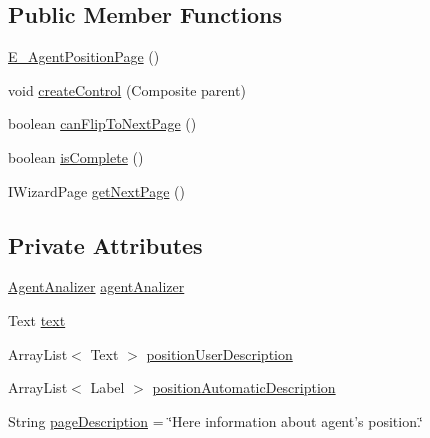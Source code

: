 \subsection*{Public Member Functions}
\begin{DoxyCompactItemize}
\item 
\hyperlink{classit_1_1isislab_1_1masonassisteddocumentation_1_1mason_1_1wizards_1_1_e___agent_position_page_a760dd943747cb5b179c21dee2718b687}{E\-\_\-\-Agent\-Position\-Page} ()
\item 
void \hyperlink{classit_1_1isislab_1_1masonassisteddocumentation_1_1mason_1_1wizards_1_1_e___agent_position_page_aa023f9adb3e974627277e49dfeb19a59}{create\-Control} (Composite parent)
\item 
boolean \hyperlink{classit_1_1isislab_1_1masonassisteddocumentation_1_1mason_1_1wizards_1_1_e___agent_position_page_a3083892a5636a17d2ea23595551cd148}{can\-Flip\-To\-Next\-Page} ()
\item 
boolean \hyperlink{classit_1_1isislab_1_1masonassisteddocumentation_1_1mason_1_1wizards_1_1_e___agent_position_page_a0dc4f5962b6178be8ffbb6102b8ccd03}{is\-Complete} ()
\item 
I\-Wizard\-Page \hyperlink{classit_1_1isislab_1_1masonassisteddocumentation_1_1mason_1_1wizards_1_1_e___agent_position_page_aacc2ca9f085699bd8c30c7f6d97866da}{get\-Next\-Page} ()
\end{DoxyCompactItemize}
\subsection*{Private Attributes}
\begin{DoxyCompactItemize}
\item 
\hyperlink{classit_1_1isislab_1_1masonassisteddocumentation_1_1mason_1_1analizer_1_1_agent_analizer}{Agent\-Analizer} \hyperlink{classit_1_1isislab_1_1masonassisteddocumentation_1_1mason_1_1wizards_1_1_e___agent_position_page_a2fe88598fc7248012ccf5298134f0196}{agent\-Analizer}
\item 
Text \hyperlink{classit_1_1isislab_1_1masonassisteddocumentation_1_1mason_1_1wizards_1_1_e___agent_position_page_aa1fe38181afe24af4925ce05d88ae0f6}{text}
\item 
Array\-List$<$ Text $>$ \hyperlink{classit_1_1isislab_1_1masonassisteddocumentation_1_1mason_1_1wizards_1_1_e___agent_position_page_a09e8462701fa4668917f97c2c2703a2c}{position\-User\-Description}
\item 
Array\-List$<$ Label $>$ \hyperlink{classit_1_1isislab_1_1masonassisteddocumentation_1_1mason_1_1wizards_1_1_e___agent_position_page_a3897e4e6c9669b071dccebca53188b08}{position\-Automatic\-Description}
\item 
String \hyperlink{classit_1_1isislab_1_1masonassisteddocumentation_1_1mason_1_1wizards_1_1_e___agent_position_page_a4737c08bab7788fba36663a11bf367fa}{page\-Description} = \char`\"{}Here information about agent's position.\char`\"{}
\end{DoxyCompactItemize}
